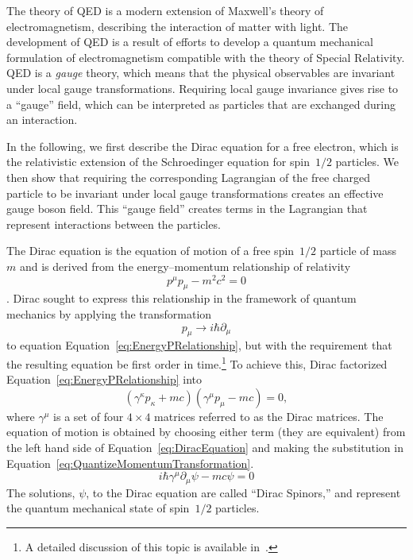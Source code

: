 The theory of QED is a modern extension of Maxwell's theory of
electromagnetism, describing the interaction of matter with light.  The
development of QED is a result of efforts to develop a quantum mechanical
formulation of electromagnetism compatible with the theory of Special Relativity.
QED is a \emph{gauge} theory, which means that the physical observables are
invariant under local gauge transformations.  Requiring local gauge
invariance gives rise to a ``gauge'' field, which can be interpreted as 
particles that are exchanged during an interaction.  

In the following, we first describe the Dirac equation for a free electron,
which is the relativistic extension of the Schroedinger equation for spin~$1/2$
particles.  We then show that requiring the corresponding Lagrangian of the free
charged particle to be invariant under local gauge transformations creates an
effective gauge boson field.  This ``gauge field'' creates terms in the
Lagrangian that represent interactions between the particles.

The Dirac equation is the equation of motion of a free spin~$1/2$ particle of
mass~$m$ and is derived from the energy--momentum relationship of relativity
\begin{equation}
  p^{\mu}p_\mu - m^2c^2 = 0
  \label{eq:EnergyPRelationship}
\end{equation}.
Dirac sought to express this relationship in the framework of quantum mechanics
by applying the transformation
\begin{equation}
  p_\mu \to i \hbar \partial_\mu 
  \label{eq:QuantizeMomentumTransformation}
\end{equation}
to equation Equation~\ref{eq:EnergyPRelationship}, but with the requirement that
the resulting equation be first order in time.\footnote{A detailed
discussion of this topic is available in~\cite{Griffiths:IntroParticle}.}
To achieve this, Dirac factorized Equation~\ref{eq:EnergyPRelationship} into 
\begin{equation}
  (\gamma^\kappa p_\kappa + mc)(\gamma^\mu p_\mu - mc) = 0,
  \label{eq:DiracEquation}
\end{equation}
where $\gamma^\mu$ is a set of four $4\times4$ matrices referred to as the Dirac
matrices.  The equation of motion is obtained by choosing either term (they are
equivalent) from the
left hand side of Equation~\ref{eq:DiracEquation} and
making the substitution in Equation~\ref{eq:QuantizeMomentumTransformation}.
\begin{equation}
  i \hbar \gamma^\mu \partial_\mu \psi - mc \psi = 0
  \label{eq:DiracEquation}
\end{equation}
The solutions, $\psi$, to the Dirac equation are called ``Dirac Spinors,'' and
represent the quantum mechanical state of spin~$1/2$ particles.

